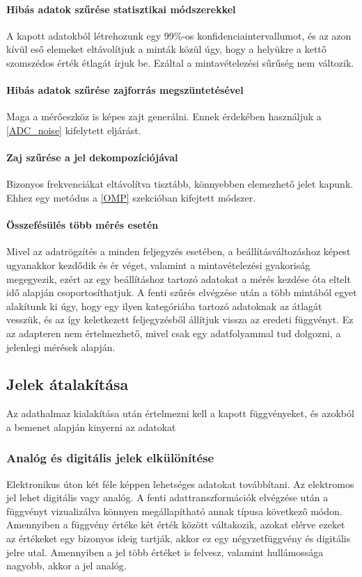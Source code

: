 \paragraph{Hibás adatok szűrése statisztikai módszerekkel} A kapott adatokból létrehozunk egy 99\%-os konfidenciaintervallumot, és az azon kívül eső elemeket eltávolítjuk a minták közül úgy, hogy a helyükre a kettő szomszédos érték étlagát írjuk be. Ezáltal a mintavételezési sűrűség nem változik.
\paragraph{Hibás adatok szűrése zajforrás megszüntetésével} Maga a mérőeszköz is képes zajt generálni. Ennek érdekében használjuk a \ref{ADC_noise} kifelytett eljárást.
\paragraph{Zaj szűrése a jel dekompozíciójával} Bizonyos frekvenciákat eltávolítva tisztább, könnyebben elemezhető jelet kapunk. Ehhez egy metódus a \ref{OMP} szekcióban kifejtett módszer.
\paragraph{Összefésülés több mérés esetén}
Mivel az adatrögzítés a minden feljegyzés esetében, a beállításváltozáshoz képest ugyanakkor kezdődik és ér véget, valamint a mintavételezési gyakoriság megegyezik, ezért az egy beállításhoz tartozó adatokat a mérés kezdése óta eltelt idő alapján csoportosíthatjuk. A fenti szűrés elvégzése után a több mintából egyet alakítunk ki úgy, hogy egy ilyen kategóriába tartozó adatoknak az átlagát vesszük, és az így keletkezett feljegyzésből állítjuk vissza az eredeti függvényt. Ez az adapteren nem értelmezhető, mivel csak egy adatfolyammal tud dolgozni, a jelenlegi mérések alapján.

\subsection{Jelek átalakítása}
Az adathalmaz kialakítása után értelmezni kell a kapott függvényeket, és azokból a bemenet alapján kinyerni az adatokat
\subsubsection{Analóg és digitális jelek elkülönítése}
Elektronikus úton két féle képpen lehetséges adatokat továbbítani. Az elektromos jel lehet digitális vagy analóg. A fenti adattranszformációk elvégzése után a függvényt vizualizálva könnyen megállapítható annak típusa következő módon. Amennyiben a függvény értéke két érték között váltakozik, azokat elérve ezeket az értékeket egy bizonyos ideig tartják, akkor ez egy négyzetfüggvény és digitális jelre utal. Amennyiben a jel több értéket is felvesz, valamint hullámossága nagyobb, akkor a jel analóg.

